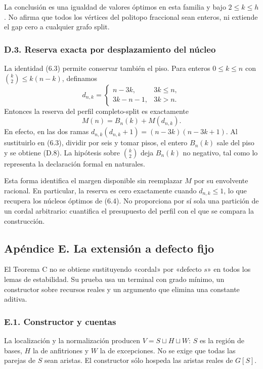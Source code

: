\documentclass[spanish,11pt,a4paper]{article}
\begin{document}
La conclusión es una igualdad de valores óptimos en esta familia y bajo \(2\le k\le h\). No afirma que todos los vértices del politopo fraccional sean enteros, ni extiende el gap cero a cualquier grafo split.

\subsubsection{D.3. Reserva exacta por desplazamiento del núcleo}\label{d.3.-reserva-exacta-por-desplazamiento-del-nucleo}

La identidad (6.3) permite conservar también el piso. Para enteros \(0\le k\le n\) con \(\binom k2\le k(n-k)\), definamos \[
d_{n,k}=\begin{cases}n-3k,&3k\le n,\\3k-n-1,&3k>n.\end{cases}
\] Entonces la reserva del perfil completo-split es exactamente \[
M(n)=B_n(k)+M(d_{n,k}).
\tag{D.8}
\] En efecto, en las dos ramas \(d_{n,k}(d_{n,k}+1)=(n-3k)(n-3k+1)\). Al sustituirlo en (6.3), dividir por seis y tomar pisos, el entero \(B_n(k)\) sale del piso y se obtiene (D.8). La hipótesis sobre \(\binom k2\) deja \(B_n(k)\) no negativo, tal como lo representa la declaración formal en naturales.

Esta forma identifica el margen disponible sin reemplazar \(M\) por su envolvente racional. En particular, la reserva es cero exactamente cuando \(d_{n,k}\le1\), lo que recupera los núcleos óptimos de (6.4). No proporciona por sí sola una partición de un cordal arbitrario: cuantifica el presupuesto del perfil con el que se compara la construcción.

\subsection{Apéndice E. La extensión a defecto fijo}\label{apendice-e.-la-extension-a-defecto-fijo}

El Teorema C no se obtiene sustituyendo «cordal» por «defecto \(s\)» en todos los lemas de estabilidad. Su prueba usa un terminal con grado mínimo, un constructor sobre recursos reales y un argumento que elimina una constante aditiva.

\subsubsection{E.1. Constructor y cuentas}\label{e.1.-constructor-y-cuentas}

La localización y la normalización producen \(V=S\sqcup H\sqcup W\): \(S\) es la región de bases, \(H\) la de anfitriones y \(W\) la de excepciones. No se exige que todas las parejas de \(S\) sean aristas. El constructor sólo hospeda las aristas reales de \(G[S]\).
\end{document}
